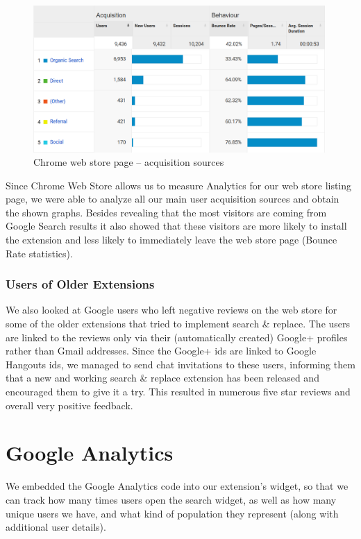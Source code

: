 \documentclass[bsc,frontabs,twoside,singlespacing,parskip,deptreport]{infthesis}
\begin{document}
\begin{figure}[h]
\centering
\includegraphics[width=0.99\textwidth]{../docs/user-acquisition-sources.png}
\caption{Chrome web store page -- acquisition sources}
\end{figure}

Since Chrome Web Store allows us to measure Analytics for our web store listing page, we were able to analyze all our main user acquisition sources and obtain the shown graphs. Besides revealing that the most visitors are coming from Google Search results it also showed that these visitors are more likely to install the extension and less likely to immediately leave the web store page (Bounce Rate statistics).

\subsubsection*{Users of Older Extensions}
We also looked at Google users who left negative reviews on the web store for some of the older extensions that tried to implement search \& replace. The users are linked to the reviews only via their (automatically created) Google+ profiles rather than Gmail addresses. Since the Google+ ids are linked to Google Hangouts ids, we managed to send chat invitations to these users, informing them that a new and working search \& replace extension has been released and encouraged them to give it a try. This resulted in numerous five star reviews and overall very positive feedback.

\section{Google Analytics}
We embedded the Google Analytics code into our extension's widget, so that we can track how many times users open the search widget, as well as how many unique users we have, and what kind of population they represent (along with additional user details).
\end{document}
